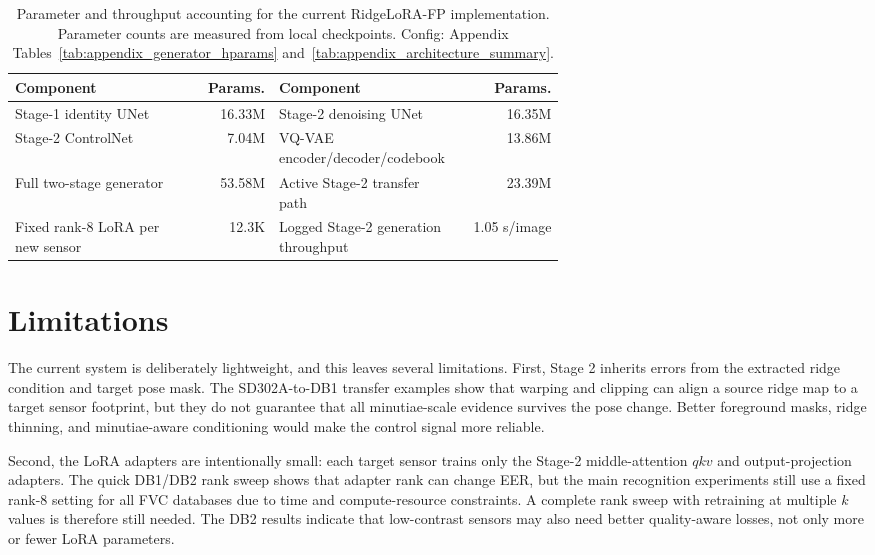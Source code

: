 \documentclass{article}
\newcommand{\method}{RidgeLoRA-FP}
\begin{document}
\begin{table}[!htbp]
    \centering
    \caption{Parameter and throughput accounting for the current \method{}
    implementation.  Parameter counts are measured from local checkpoints.
    Config: Appendix Tables~\ref{tab:appendix_generator_hparams}
    and~\ref{tab:appendix_architecture_summary}.}
    \label{tab:efficiency}
    \scriptsize
    \setlength{\tabcolsep}{3.2pt}
    \renewcommand{\arraystretch}{0.92}
    \begin{tabular}{p{0.33\linewidth}rp{0.31\linewidth}r}
        \toprule
        Component & Params. & Component & Params. \\
        \midrule
        Stage-1 identity UNet & 16.33M &
        Stage-2 denoising UNet & 16.35M \\
        Stage-2 ControlNet & 7.04M &
        VQ-VAE encoder/decoder/codebook & 13.86M \\
        Full two-stage generator & 53.58M &
        Active Stage-2 transfer path & 23.39M \\
        \midrule
        Fixed rank-8 LoRA per new sensor & 12.3K &
        Logged Stage-2 generation throughput & 1.05 s/image \\
        \bottomrule
    \end{tabular}
\end{table}
\FloatBarrier

\section{Limitations}
\label{sec:limitations}

The current system is deliberately lightweight, and this leaves several
limitations.  First, Stage 2 inherits errors from the extracted ridge condition
and target pose mask.  The SD302A-to-DB1 transfer examples show that warping and
clipping can align a source ridge map to a target sensor footprint, but they do
not guarantee that all minutiae-scale evidence survives the pose change.  Better
foreground masks, ridge thinning, and minutiae-aware conditioning would make the
control signal more reliable.

Second, the LoRA adapters are intentionally small: each target sensor trains
only the Stage-2 middle-attention $qkv$ and output-projection adapters.  The
quick DB1/DB2 rank sweep shows that adapter rank can change EER, but the main
recognition experiments still use a fixed rank-8 setting for all FVC databases
due to time and compute-resource constraints.  A complete rank sweep with
retraining at multiple $k$ values is therefore still needed.  The DB2 results
indicate that low-contrast sensors may also need better quality-aware losses,
not only more or fewer LoRA parameters.
\end{document}
